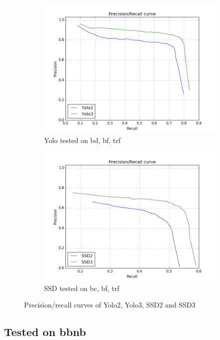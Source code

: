 \begin{figure}[h!]
\begin{subfigure}{.5\textwidth}
  \centering
  \includegraphics[width=0.8\linewidth]{results/case_buildings/prec_recall/yolo/bcbftrf.png}
  \caption{Yolo tested on bd, bf, trf}
  \label{fig:sfig1}
\end{subfigure}%
\begin{subfigure}{.5\textwidth}
  \centering
  \includegraphics[width=.8\linewidth]{results/case_buildings/prec_recall/ssd/bcbftrf.png}
  \caption{SSD tested on bc, bf, trf}
  \label{fig:sfig2}
\end{subfigure}
\caption{Precision/recall curves of Yolo2, Yolo3, SSD2 and SSD3}
\label{fig:case_build}
\end{figure}

\newpage

\subsection{Tested on bbnb}

